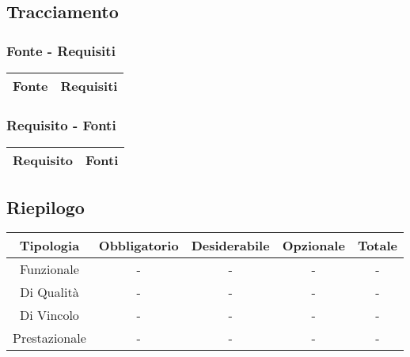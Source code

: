 \subsection{Tracciamento}
\subsubsection{Fonte - Requisiti}
\begin{center}
	\begin{tabular}{ |c|c| } 
		\hline
		\textbf{Fonte} & \textbf{Requisiti} \\
		\hline
	\end{tabular}
\end{center}

\subsubsection{Requisito - Fonti}
\begin{center}
	\begin{tabular}{ |c|c| } 
		\hline
		\textbf{Requisito} & \textbf{Fonti} \\
		\hline
	\end{tabular}
\end{center}

\subsection{Riepilogo}
\begin{center}
	\begin{tabular}{ |c|c|c|c|c| } 
		\hline
		\textbf{Tipologia} & \textbf{Obbligatorio} & \textbf{Desiderabile} & \textbf{Opzionale} & \textbf{Totale}\\
		\hline
		Funzionale & - & - & - & - \\
		\hline
		Di Qualità & - & - & - & - \\
		\hline
		Di Vincolo & - & - & - & - \\
		\hline
		Prestazionale & - & - & - & - \\
		\hline
	\end{tabular}
\end{center}
